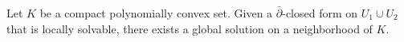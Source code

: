 
Let $K$ be a compact polynomially convex set. Given a $\bar{\partial}$-closed form on $U_1 \cup U_2$ that is locally solvable, there exists a global solution on a neighborhood of $K$.
